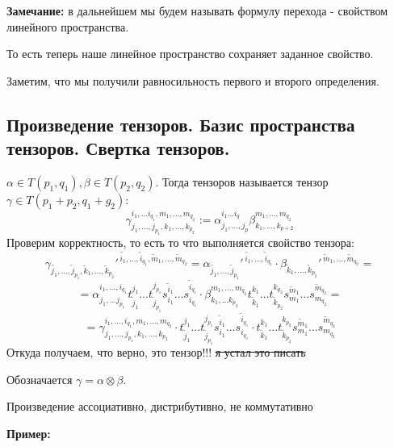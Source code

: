 \textbf{Замечание:} в дальнейшем мы будем называть формулу перехода - свойством линейного пространства.

То есть теперь наше линейное пространство сохраняет заданное свойство.


Заметим, что мы получили равносильность первого и второго определения.


\subsection{Произведение тензоров. Базис пространства тензоров. Свертка тензоров.}

 $\alpha \in T(p_1,q_1),\beta \in T(p_2,q_2)$. Тогда  тензоров называется тензор $\gamma \in T(p_1+p_2,q_1+g_2):$ 
$$\gamma^{i_1,\ldots i_{q_1},m_1,\ldots,m_{q_2}}_{j_1,\ldots,j_{p_1},k_1,\ldots, k_{p_2}}:= \alpha^{i_1\ldots i_q}_{j_1,\ldots,j_p} \beta^{m_1,\ldots,m_{q_2}}_{k_1,\ldots, k_{p+2}}$$
Проверим корректность, то есть то что выполняется свойство тензора:
$$\gamma_{\widetilde{j_1},\ldots,\widetilde{j}_{p_1}, \widetilde{k}_1,\ldots, \widetilde{k}_{p_2}}'^{\, \widetilde{i_1},\ldots,\widetilde{i}_{q_1}, \widetilde{m}_1,\ldots, \widetilde{m}_{q_2}} = \alpha_{\widetilde{j_1},\ldots,\widetilde{j}_{p_1}}'^{\, \widetilde{i_1},\ldots,\widetilde{i}_{q_1}} \cdot \beta_{ \widetilde{k}_1,\ldots, \widetilde{k}_{p_2}}'^{\,\widetilde{m}_1,\ldots, \widetilde{m}_{q_2}} = $$
$$= \alpha_{j_1,\ldots j_{p_1}}^{i_1,\ldots, i_{q_1}} t_{\widetilde{j}_1}^{j_1}\ldots t_{\widetilde{j}_{p_1}}^{j_{p_1}} s_{i_1}^{\widetilde{i}_1}\ldots s_{i_{q_1}}^{\widetilde{i}_{q_1}}\cdot \beta_{k_1,\ldots k_{p_2}}^{m_1,\ldots, m_{q_2}} t_{\widetilde{k}_1}^{k_1}\ldots t_{\widetilde{k}_{p_2}}^{k_{p_2}} s_{m_1}^{\widetilde{m}_1}\ldots s_{m_{q_2}}^{\widetilde{m}_{q_2}} = $$
$$=\gamma_{j_1,\ldots,j_{p_1},k_1,\ldots , k_{p_2}}^{i_1,\ldots, i_{q_1}, m_1,\ldots,m_{q_2}}\cdot t_{\widetilde{j}_1}^{j_1}\ldots t_{\widetilde{j}_{p_1}}^{j_{p_1}} s_{i_1}^{\widetilde{i}_1}\ldots s_{i_{q_1}}^{\widetilde{i}_{q_1}}\cdot t_{\widetilde{k}_1}^{k_1}\ldots t_{\widetilde{k}_{p_2}}^{k_{p_2}} s_{m_1}^{\widetilde{m}_1}\ldots s_{m_{q_2}}^{\widetilde{m}_{q_2}}$$
Откуда получаем, что верно, это тензор!!! \sout{я устал это писать}

Обозначается $\gamma = \alpha \otimes \beta$.

Произведение ассоциативно, дистрибутивно, не коммутативно



\textbf{Пример:}

